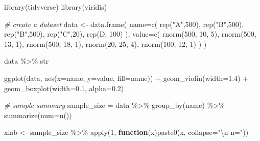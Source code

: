 \documentclass[
]{book}
\newenvironment{Shaded}{\begin{snugshade}}{\end{snugshade}}
\newcommand{\AttributeTok}[1]{\textcolor[rgb]{0.77,0.63,0.00}{#1}}
\newcommand{\CommentTok}[1]{\textcolor[rgb]{0.56,0.35,0.01}{\textit{#1}}}
\newcommand{\ControlFlowTok}[1]{\textcolor[rgb]{0.13,0.29,0.53}{\textbf{#1}}}
\newcommand{\DecValTok}[1]{\textcolor[rgb]{0.00,0.00,0.81}{#1}}
\newcommand{\FloatTok}[1]{\textcolor[rgb]{0.00,0.00,0.81}{#1}}
\newcommand{\FunctionTok}[1]{\textcolor[rgb]{0.00,0.00,0.00}{#1}}
\newcommand{\NormalTok}[1]{#1}
\newcommand{\OtherTok}[1]{\textcolor[rgb]{0.56,0.35,0.01}{#1}}
\newcommand{\SpecialCharTok}[1]{\textcolor[rgb]{0.00,0.00,0.00}{#1}}
\newcommand{\StringTok}[1]{\textcolor[rgb]{0.31,0.60,0.02}{#1}}
\begin{document}
\begin{Shaded}
\begin{Highlighting}[]
\FunctionTok{library}\NormalTok{(tidyverse)}
\FunctionTok{library}\NormalTok{(viridis)}

\CommentTok{\# create a dataset}
\NormalTok{data }\OtherTok{\textless{}{-}} \FunctionTok{data.frame}\NormalTok{(}
  \AttributeTok{name=}\FunctionTok{c}\NormalTok{( }\FunctionTok{rep}\NormalTok{(}\StringTok{"A"}\NormalTok{,}\DecValTok{500}\NormalTok{), }\FunctionTok{rep}\NormalTok{(}\StringTok{"B"}\NormalTok{,}\DecValTok{500}\NormalTok{), }\FunctionTok{rep}\NormalTok{(}\StringTok{"B"}\NormalTok{,}\DecValTok{500}\NormalTok{), }\FunctionTok{rep}\NormalTok{(}\StringTok{"C"}\NormalTok{,}\DecValTok{20}\NormalTok{), }\FunctionTok{rep}\NormalTok{(}\StringTok{\textquotesingle{}D\textquotesingle{}}\NormalTok{, }\DecValTok{100}\NormalTok{)  ),}
  \AttributeTok{value=}\FunctionTok{c}\NormalTok{( }\FunctionTok{rnorm}\NormalTok{(}\DecValTok{500}\NormalTok{, }\DecValTok{10}\NormalTok{, }\DecValTok{5}\NormalTok{), }\FunctionTok{rnorm}\NormalTok{(}\DecValTok{500}\NormalTok{, }\DecValTok{13}\NormalTok{, }\DecValTok{1}\NormalTok{), }\FunctionTok{rnorm}\NormalTok{(}\DecValTok{500}\NormalTok{, }\DecValTok{18}\NormalTok{, }\DecValTok{1}\NormalTok{), }\FunctionTok{rnorm}\NormalTok{(}\DecValTok{20}\NormalTok{, }\DecValTok{25}\NormalTok{, }\DecValTok{4}\NormalTok{), }\FunctionTok{rnorm}\NormalTok{(}\DecValTok{100}\NormalTok{, }\DecValTok{12}\NormalTok{, }\DecValTok{1}\NormalTok{) )}
\NormalTok{)}

\NormalTok{data }\SpecialCharTok{\%\textgreater{}\%}\NormalTok{ str}

\FunctionTok{ggplot}\NormalTok{(data, }\FunctionTok{aes}\NormalTok{(}\AttributeTok{x=}\NormalTok{name, }\AttributeTok{y=}\NormalTok{value, }\AttributeTok{fill=}\NormalTok{name)) }\SpecialCharTok{+}
    \FunctionTok{geom\_violin}\NormalTok{(}\AttributeTok{width=}\FloatTok{1.4}\NormalTok{) }\SpecialCharTok{+}
    \FunctionTok{geom\_boxplot}\NormalTok{(}\AttributeTok{width=}\FloatTok{0.1}\NormalTok{, }\AttributeTok{alpha=}\FloatTok{0.2}\NormalTok{) }

\CommentTok{\# sample summary}
\NormalTok{sample\_size }\OtherTok{=}\NormalTok{ data }\SpecialCharTok{\%\textgreater{}\%} 
  \FunctionTok{group\_by}\NormalTok{(name) }\SpecialCharTok{\%\textgreater{}\%} 
  \FunctionTok{summarize}\NormalTok{(}\AttributeTok{num=}\FunctionTok{n}\NormalTok{()) }

\NormalTok{xlab }\OtherTok{\textless{}{-}}\NormalTok{ sample\_size }\SpecialCharTok{\%\textgreater{}\%} 
  \FunctionTok{apply}\NormalTok{(}\DecValTok{1}\NormalTok{, }\ControlFlowTok{function}\NormalTok{(x)}\FunctionTok{paste0}\NormalTok{(x, }\AttributeTok{collapse=}\StringTok{"}\SpecialCharTok{\textbackslash{}n}\StringTok{ n="}\NormalTok{))}


\end{Highlighting}
\end{Shaded}
\end{document}
